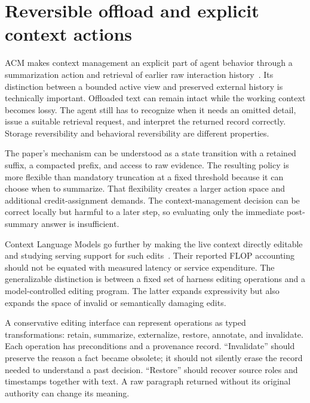 \section{Reversible offload and explicit context actions}\label{sec:C12:offload}
ACM makes context management an explicit part of agent behavior through a summarization action and retrieval of earlier raw interaction history~\cite{corpus260723809}. Its distinction between a bounded active view and preserved external history is technically important. Offloaded text can remain intact while the working context becomes lossy. The agent still has to recognize when it needs an omitted detail, issue a suitable retrieval request, and interpret the returned record correctly. Storage reversibility and behavioral reversibility are different properties.

The paper's mechanism can be understood as a state transition with a retained suffix, a compacted prefix, and access to raw evidence. The resulting policy is more flexible than mandatory truncation at a fixed threshold because it can choose when to summarize. That flexibility creates a larger action space and additional credit-assignment demands. The context-management decision can be correct locally but harmful to a later step, so evaluating only the immediate post-summary answer is insufficient.

Context Language Models go further by making the live context directly editable and studying serving support for such edits~\cite{shao2026context}. Their reported FLOP accounting should not be equated with measured latency or service expenditure. The generalizable distinction is between a fixed set of harness editing operations and a model-controlled editing program. The latter expands expressivity but also expands the space of invalid or semantically damaging edits.

A conservative editing interface can represent operations as typed transformations: retain, summarize, externalize, restore, annotate, and invalidate. Each operation has preconditions and a provenance record. ``Invalidate'' should preserve the reason a fact became obsolete; it should not silently erase the record needed to understand a past decision. ``Restore'' should recover source roles and timestamps together with text. A raw paragraph returned without its original authority can change its meaning.

